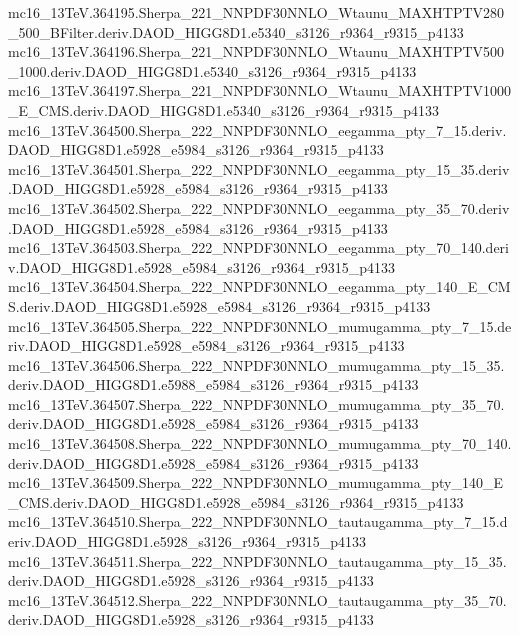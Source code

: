 \begin{scriptsize}
mc16\_13TeV.364195.Sherpa\_221\_NNPDF30NNLO\_Wtaunu\_MAXHTPTV280\_500\_BFilter.deriv.DAOD\_HIGG8D1.e5340\_s3126\_r9364\_r9315\_p4133 \\
mc16\_13TeV.364196.Sherpa\_221\_NNPDF30NNLO\_Wtaunu\_MAXHTPTV500\_1000.deriv.DAOD\_HIGG8D1.e5340\_s3126\_r9364\_r9315\_p4133 \\
mc16\_13TeV.364197.Sherpa\_221\_NNPDF30NNLO\_Wtaunu\_MAXHTPTV1000\_E\_CMS.deriv.DAOD\_HIGG8D1.e5340\_s3126\_r9364\_r9315\_p4133 \\
mc16\_13TeV.364500.Sherpa\_222\_NNPDF30NNLO\_eegamma\_pty\_7\_15.deriv.DAOD\_HIGG8D1.e5928\_e5984\_s3126\_r9364\_r9315\_p4133 \\
mc16\_13TeV.364501.Sherpa\_222\_NNPDF30NNLO\_eegamma\_pty\_15\_35.deriv.DAOD\_HIGG8D1.e5928\_e5984\_s3126\_r9364\_r9315\_p4133 \\
mc16\_13TeV.364502.Sherpa\_222\_NNPDF30NNLO\_eegamma\_pty\_35\_70.deriv.DAOD\_HIGG8D1.e5928\_e5984\_s3126\_r9364\_r9315\_p4133 \\
mc16\_13TeV.364503.Sherpa\_222\_NNPDF30NNLO\_eegamma\_pty\_70\_140.deriv.DAOD\_HIGG8D1.e5928\_e5984\_s3126\_r9364\_r9315\_p4133 \\
mc16\_13TeV.364504.Sherpa\_222\_NNPDF30NNLO\_eegamma\_pty\_140\_E\_CMS.deriv.DAOD\_HIGG8D1.e5928\_e5984\_s3126\_r9364\_r9315\_p4133 \\
mc16\_13TeV.364505.Sherpa\_222\_NNPDF30NNLO\_mumugamma\_pty\_7\_15.deriv.DAOD\_HIGG8D1.e5928\_e5984\_s3126\_r9364\_r9315\_p4133 \\
mc16\_13TeV.364506.Sherpa\_222\_NNPDF30NNLO\_mumugamma\_pty\_15\_35.deriv.DAOD\_HIGG8D1.e5988\_e5984\_s3126\_r9364\_r9315\_p4133 \\
mc16\_13TeV.364507.Sherpa\_222\_NNPDF30NNLO\_mumugamma\_pty\_35\_70.deriv.DAOD\_HIGG8D1.e5928\_e5984\_s3126\_r9364\_r9315\_p4133 \\
mc16\_13TeV.364508.Sherpa\_222\_NNPDF30NNLO\_mumugamma\_pty\_70\_140.deriv.DAOD\_HIGG8D1.e5928\_e5984\_s3126\_r9364\_r9315\_p4133 \\
mc16\_13TeV.364509.Sherpa\_222\_NNPDF30NNLO\_mumugamma\_pty\_140\_E\_CMS.deriv.DAOD\_HIGG8D1.e5928\_e5984\_s3126\_r9364\_r9315\_p4133 \\
mc16\_13TeV.364510.Sherpa\_222\_NNPDF30NNLO\_tautaugamma\_pty\_7\_15.deriv.DAOD\_HIGG8D1.e5928\_s3126\_r9364\_r9315\_p4133 \\
mc16\_13TeV.364511.Sherpa\_222\_NNPDF30NNLO\_tautaugamma\_pty\_15\_35.deriv.DAOD\_HIGG8D1.e5928\_s3126\_r9364\_r9315\_p4133 \\
mc16\_13TeV.364512.Sherpa\_222\_NNPDF30NNLO\_tautaugamma\_pty\_35\_70.deriv.DAOD\_HIGG8D1.e5928\_s3126\_r9364\_r9315\_p4133 \\

\end{scriptsize}
